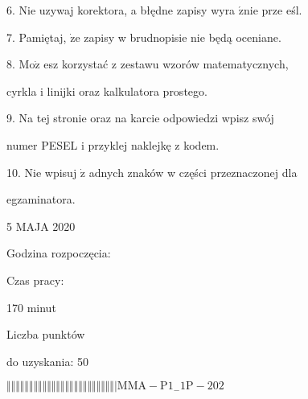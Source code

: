 \documentclass[a4paper,12pt]{article}
\begin{document}
6. Nie uzywaj korektora, a błędne zapisy wyra $\acute{\mathrm{z}}\mathrm{n}\mathrm{i}\mathrm{e}$ prze eśl.

7. Pamiętaj, $\dot{\mathrm{z}}\mathrm{e}$ zapisy w brudnopisie nie będą oceniane.

8. $\mathrm{M}\mathrm{o}\dot{\mathrm{z}}$ esz korzystać z zestawu wzorów matematycznych,

cyrkla i linijki oraz kalkulatora prostego.

9. Na tej stronie oraz na karcie odpowiedzi wpisz swój

numer PESEL i przyklej naklejkę z kodem.

10. Nie wpisuj $\dot{\mathrm{z}}$ adnych znaków w części przeznaczonej dla

egzaminatora.

5 MAJA 2020

Godzina rozpoczęcia:

Czas pracy:

170 minut

Liczba punktów

do uzyskania: 50

$\Vert\Vert\Vert\Vert\Vert\Vert\Vert\Vert\Vert\Vert\Vert\Vert\Vert\Vert\Vert\Vert\Vert\Vert\Vert\Vert\Vert\Vert\Vert\Vert|  \mathrm{M}\mathrm{M}\mathrm{A}-\mathrm{P}1_{-}1\mathrm{P}-202$
\end{document}
